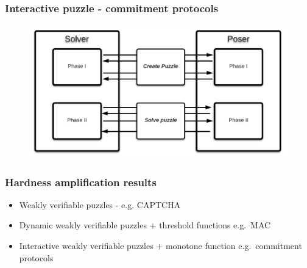 \documentclass[first,firstsupp,handout,last]{ETHclass}
\begin{document}
\begin{frame}[t]
  \frametitle{Interactive puzzle - commitment protocols}
  \begin{figure}
    \includegraphics[scale=0.43]{images/IntProtocol.pdf}
  \end{figure}
\end{frame}

\begin{frame}[t]
  \frametitle{Hardness amplification results}
  \begin{itemize}
    \item<1-3> Weakly verifiable puzzles - e.g. CAPTCHA \cite{canetti2005hardness}
    \item<2-3> Dynamic weakly verifiable puzzles $+$ threshold functions e.g.~MAC \cite{dodis2009security}
    \item<3> Interactive weakly verifiable puzzles $+$ monotone function e.g.~commitment protocols \cite{holenstein2011general}
  \end{itemize}
  \centering
\end{frame}
\end{document}
